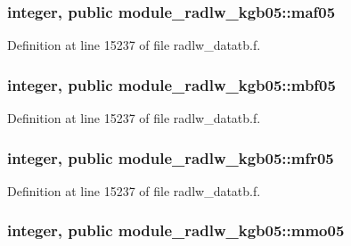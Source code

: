 \subsubsection[{\texorpdfstring{maf05}{maf05}}]{\setlength{\rightskip}{0pt plus 5cm}integer, public module\+\_\+radlw\+\_\+kgb05\+::maf05}\hypertarget{namespacemodule__radlw__kgb05_aba904215976d7f4316b52c8f0cffe595}{}\label{namespacemodule__radlw__kgb05_aba904215976d7f4316b52c8f0cffe595}


Definition at line 15237 of file radlw\+\_\+datatb.\+f.

\subsubsection[{\texorpdfstring{mbf05}{mbf05}}]{\setlength{\rightskip}{0pt plus 5cm}integer, public module\+\_\+radlw\+\_\+kgb05\+::mbf05}\hypertarget{namespacemodule__radlw__kgb05_a57db9a9cb9acac604df555038f6127a3}{}\label{namespacemodule__radlw__kgb05_a57db9a9cb9acac604df555038f6127a3}


Definition at line 15237 of file radlw\+\_\+datatb.\+f.

\subsubsection[{\texorpdfstring{mfr05}{mfr05}}]{\setlength{\rightskip}{0pt plus 5cm}integer, public module\+\_\+radlw\+\_\+kgb05\+::mfr05}\hypertarget{namespacemodule__radlw__kgb05_a44f07da9a7f99377f7d331249c475b80}{}\label{namespacemodule__radlw__kgb05_a44f07da9a7f99377f7d331249c475b80}


Definition at line 15237 of file radlw\+\_\+datatb.\+f.

\subsubsection[{\texorpdfstring{mmo05}{mmo05}}]{\setlength{\rightskip}{0pt plus 5cm}integer, public module\+\_\+radlw\+\_\+kgb05\+::mmo05}\hypertarget{namespacemodule__radlw__kgb05_aa552aae4878030144218ca6c2bbe417f}{}\label{namespacemodule__radlw__kgb05_aa552aae4878030144218ca6c2bbe417f}


